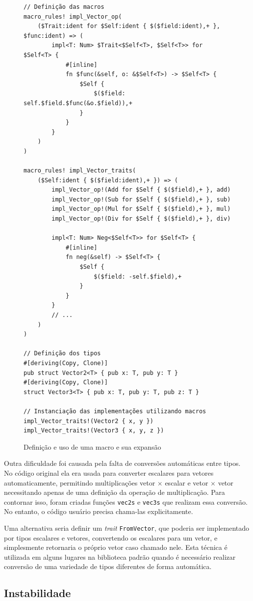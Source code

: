 \documentclass[tg]{mdtufsm}
\begin{document}
\begin{figure}
\begin{lstlisting}
// Definição das macros
macro_rules! impl_Vector_op(
	($Trait:ident for $Self:ident { $($field:ident),+ }, $func:ident) => (
		impl<T: Num> $Trait<$Self<T>, $Self<T>> for $Self<T> {
			#[inline]
			fn $func(&self, o: &$Self<T>) -> $Self<T> {
				$Self {
					$($field: self.$field.$func(&o.$field)),+
				}
			}
		}
	)
)

macro_rules! impl_Vector_traits(
	($Self:ident { $($field:ident),+ }) => (
		impl_Vector_op!(Add for $Self { $($field),+ }, add)
		impl_Vector_op!(Sub for $Self { $($field),+ }, sub)
		impl_Vector_op!(Mul for $Self { $($field),+ }, mul)
		impl_Vector_op!(Div for $Self { $($field),+ }, div)

		impl<T: Num> Neg<$Self<T>> for $Self<T> {
			#[inline]
			fn neg(&self) -> $Self<T> {
				$Self {
					$($field: -self.$field),+
				}
			}
		}
		// ...
	)
)

// Definição dos tipos
#[deriving(Copy, Clone)]
pub struct Vector2<T> { pub x: T, pub y: T }
#[deriving(Copy, Clone)]
struct Vector3<T> { pub x: T, pub y: T, pub z: T }

// Instanciação das implementações utilizando macros
impl_Vector_traits!(Vector2 { x, y })
impl_Vector_traits!(Vector3 { x, y, z })
\end{lstlisting}
	\caption{Definição e uso de uma macro e sua expansão}
	\label{code:mathmacro}
\end{figure}

Outra dificuldade foi causada pela falta de conversões automáticas entre tipos. No código original ela era usada para converter escalares para vetores automaticamente, permitindo multiplicações vetor $\times$ escalar e vetor $\times$ vetor necessitando apenas de uma definição da operação de multiplicação. Para contornar isso, foram criadas funções \texttt{vec2s} e \texttt{vec3s} que realizam essa conversão. No entanto, o código usuário precisa chama-las explicitamente.

Uma alternativa seria definir um \emph{trait} \texttt{FromVector}, que poderia ser implementado por tipos escalares e vetores, convertendo os escalares para um vetor, e simplesmente retornaria o próprio vetor caso chamado nele. Esta técnica é utilizada em alguns lugares na biblioteca padrão quando é necessário realizar conversão de uma variedade de tipos diferentes de forma automática.

\subsection{Instabilidade}
\end{document}
